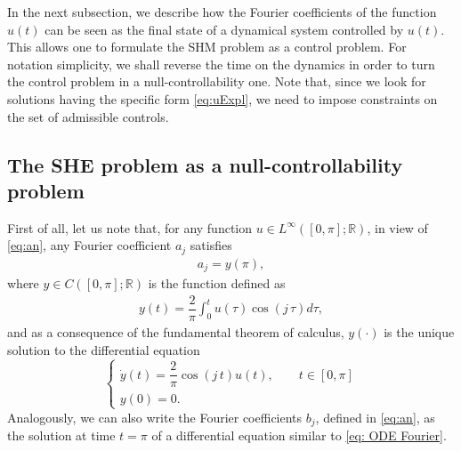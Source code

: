 \documentclass[twocolumn]{autart}    %
\begin{document}
In the next subsection, we describe how the Fourier coefficients of the function $u(t)$ can be seen as the final state of a dynamical system controlled by $u(t)$. This allows one to formulate the SHM problem as a control problem. For notation simplicity, we shall reverse the time on the dynamics in order to turn the control problem in a null-controllability one. Note that, since we look for solutions having the specific form \eqref{eq:uExpl}, we need to impose constraints on the set of admissible controls.


\subsection{The SHE problem as  a null-controllability problem}

First of all,  let us note that, for any function $u\in L^\infty ([0,\pi]; \mathbb{R})$, in view of \eqref{eq:an},  any Fourier coefficient $a_j$ satisfies
\begin{align*}
	a_j = y(\pi), 
\end{align*}
where $y\in C([0,\pi];\mathbb{R})$ is the function defined as
\begin{align*}
	y(t) = \dfrac{2}{\pi} \int_0^t u(\tau) \cos(j\, \tau) d\tau,	
\end{align*}
and as a consequence of the fundamental theorem of calculus, $y(\cdot)$ is the unique solution to the differential equation
\begin{equation}\label{eq: ODE Fourier}
	\begin{cases}
		\dot{y} (t) = \dfrac{2}{\pi} \cos(j\, t) u(t), \qquad  t\in [0,\pi]
		\\[5pt]
		y(0) = 0.
	\end{cases}
\end{equation}
Analogously, we can also write the Fourier coefficients $b_j$, defined in \eqref{eq:an}, as the solution at time $t=\pi$ of a differential equation similar to \eqref{eq: ODE Fourier}.
\end{document}
